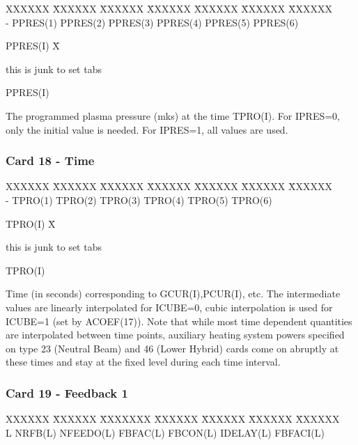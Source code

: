 \begin{tabbing}
XXXXXX \= XXXXXX \= XXXXXX \= XXXXXX \= XXXXXX \= XXXXXX \=
XXXXXX       \\
\footnotesize  -  \>\footnotesize PPRES(1)  \>\footnotesize PPRES(2) \>\footnotesize PPRES(3)
\>\footnotesize PPRES(4)  \>\footnotesize PPRES(5) \>\footnotesize PPRES(6)
\end{tabbing}
\begin{tabbing}
PPRES(I) X\= \parbox[t]{\width}{this is junk to set tabs} \kill
PPRES(I) \> \parbox[t]{\width}{The programmed plasma pressure (mks) at the time TPRO(I).
For
IPRES=0, only the initial value is needed. For IPRES=1, all values are used.}
\end{tabbing}
\newpage \subsubsection{Card 18 - Time }
\begin{tabbing}
XXXXXX \= XXXXXX \= XXXXXX \= XXXXXX \= XXXXXX \= XXXXXX \=XXXXXX
      \\
\footnotesize  -  \>\footnotesize TPRO(1)  \>\footnotesize TPRO(2) \>\footnotesize TPRO(3)
\>\footnotesize TPRO(4)  \>\footnotesize TPRO(5) \>\footnotesize TPRO(6)
\end{tabbing}
\begin{tabbing}
TPRO(I) X\= \parbox[t]{\width}{this is junk to set tabs} \kill
TPRO(I) \> \parbox[t]{\width}{Time (in seconds) corresponding to GCUR(I),PCUR(I), etc.  The
intermediate values are linearly interpolated for ICUBE=0, cubic interpolation is used for
ICUBE=1 (set by ACOEF(17)).  Note that while most time dependent quantities are interpolated
between time points, auxiliary heating system powers specified on type 23 (Neutral Beam) and 46
 (Lower Hybrid) cards come on abruptly at these times and stay at the fixed level during each time
interval.}
\end{tabbing}
\newpage \subsubsection{Card 19 - Feedback 1}
\begin{tabbing}
XXXXXX \= XXXXXX \= XXXXXXX \= XXXXXX \= XXXXXX \= XXXXXX \=XXXXXX
      \\
\footnotesize  L  \>\footnotesize NRFB(L)  \>\footnotesize NFEEDO(L) \>\footnotesize
FBFAC(L) \>\footnotesize FBCON(L)  \>\footnotesize IDELAY(L) \>\footnotesize FBFACI(L)
\end{tabbing}

